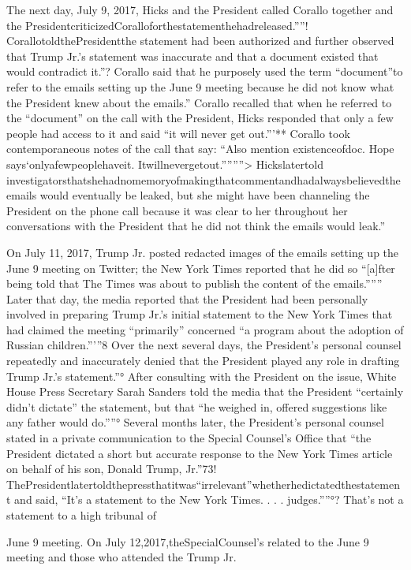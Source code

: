 The next day, July 9, 2017, Hicks and the President called Corallo together and the PresidentcriticizedCoralloforthestatementhehadreleased.””! CorallotoldthePresidentthe statement had been authorized and further observed that Trump Jr.'s statement was inaccurate and that a document existed that would contradict it.”? Corallo said that he purposely used the term “document”to refer to the emails setting up the June 9 meeting because he did not know what the President knew about the emails.” Corallo recalled that when he referred to the “document” on the call with the President, Hicks responded that only a few people had access to it and said “it will never get out.”'** Corallo took contemporaneous notes of the call that say: “Also mention existenceofdoc. Hope says‘onlyafewpeoplehaveit. Itwillnevergetout.””””> Hickslatertold investigatorsthatshehadnomemoryofmakingthatcommentandhadalwaysbelievedtheemails would eventually be leaked, but she might have been channeling the President on the phone call because it was clear to her throughout her conversations with the President that he did not think the emails would leak.”

On July 11, 2017, Trump Jr. posted redacted images of the emails setting up the June 9 meeting on Twitter; the New York Times reported that he did so “[a]fter being told that The Times was about to publish the content of the emails.””” Later that day, the media reported that the President had been personally involved in preparing Trump Jr.'s initial statement to the New York Times that had claimed the meeting “primarily” concerned “a program about the adoption of Russian children.”'”8 Over the next several days, the President's personal counsel repeatedly and inaccurately denied that the President played any role in drafting Trump Jr.'s statement.”° After consulting with the President on the issue, White House Press Secretary Sarah Sanders told the media that the President “certainly didn't dictate” the statement, but that “he weighed in, offered suggestions like any father would do.””° Several months later, the President's personal counsel stated in a private communication to the Special Counsel's Office that “the President dictated a short but accurate response to the New York Times article on behalf of his son, Donald Trump,
Jr.”73! ThePresidentlatertoldthepressthatitwas“irrelevant”whetherhedictatedthestatement
and said, “It's a statement to the New York Times. . . . judges.””°?
That's not a statement to a high tribunal of

June 9 meeting.
On July 12,2017,theSpecialCounsel's
related to the June 9 meeting and those who attended the
Trump Jr.

